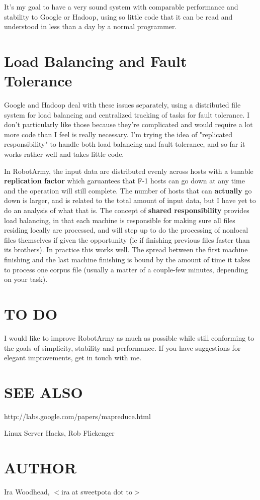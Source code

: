 \documentclass{tufte-handout}
\begin{document}
It's my goal to have a very sound system with comparable performance and stability to Google or Hadoop, using so little code that it can be read and understood in less than a day by a normal programmer.

\section{Load Balancing and Fault Tolerance\label{Load_Balancing_and_Fault_Tolerance}}


Google and Hadoop deal with these issues separately, using a distributed file system for load balancing and centralized tracking of tasks for fault tolerance. I don't particularly like those because they're complicated and would require a lot more code than I feel is really necessary. I'm trying the idea of "replicated responsibility" to handle both load balancing and fault tolerance, and so far it works rather well and takes little code.



In RobotArmy, the input data are distributed evenly across hosts with a tunable \textbf{replication factor} which garuantees that F-1 hosts can go down at any time and the operation will still complete. The number of hosts that can \textbf{actually} go down is larger, and is related to the total amount of input data, but I have yet to do an analysis of what that is. The concept of \textbf{shared responsibility} provides load balancing, in that each machine is responsible for making sure all files residing locally are processed, and will step up to do the processing of nonlocal files themselves if given the opportunity (ie if finishing previous files faster than its brothers). In practice this works well. The spread between the first machine finishing and the last machine finishing is bound by the amount of time it takes to process one corpus file (usually a matter of a couple-few minutes, depending on your task).

\section{TO DO\label{TO_DO}}


I would like to improve RobotArmy as much as possible while still conforming to the goals of simplicity, stability and performance. If you have suggestions for elegant improvements, get in touch with me.

\section{SEE ALSO\label{SEE_ALSO}}


http://labs.google.com/papers/mapreduce.html



Linux Server Hacks, Rob Flickenger

\section{AUTHOR\label{AUTHOR}}


Ira Woodhead, $<$ira at sweetpota dot to$>$









\end{document}
